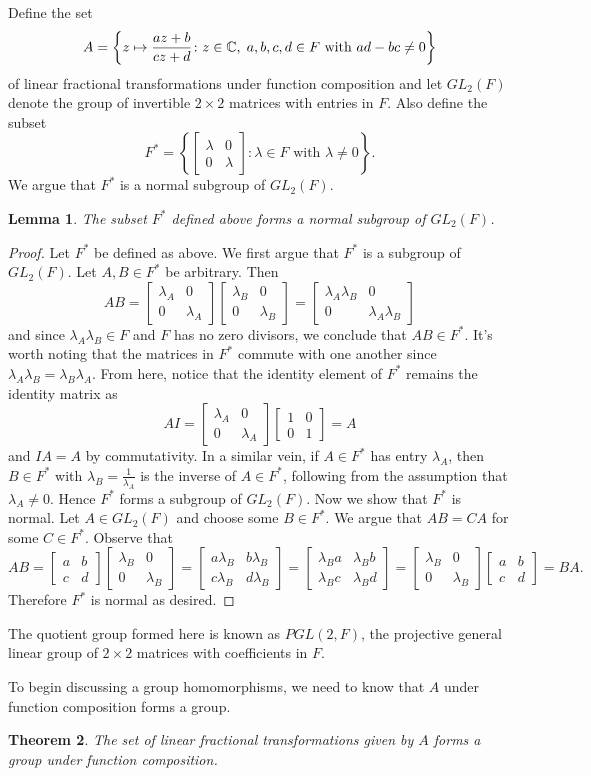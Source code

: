 \documentclass[12pt]{article}
\newcommand{\C}{\mathbb{C}}
\newcommand{\lftmat}[4]{\begin{bmatrix} {#1} & {#2} \\ {#3} & {#4} \end{bmatrix}}
\newcommand{\stanlftmat}{\lftmat{a}{b}{c}{d}}
\newcommand{\ttc}{, \hspace{1mm}}
\theoremstyle{plain}
\newtheorem{theorem}{Theorem}[section]
\newtheorem{lemma}[theorem]{Lemma}
\theoremstyle{definition}
\begin{document}
\begin{appendices}
\noindent Define the set
	\[
		A = \left\lbrace z\mapsto \frac{az + b}{cz + d}\colon z\in\C\ttc a,b,c,d\in F\text{ with } ad - bc \neq 0\right\rbrace
	\]
of linear fractional transformations under function composition and let $GL_2(F)$ denote the group of invertible $2\times 2$ matrices with entries in $F$. Also define the subset
	\[
		F^* = \left\lbrace\lftmat{\lambda}{0}{0}{\lambda}\colon \lambda\in F\text{ with } \lambda\neq 0 \right\rbrace.
	\]
	We argue that $F^*$ is a normal subgroup of $GL_2(F)$.
\begin{lemma}
	The subset $F^*$ defined above forms a normal subgroup of $GL_2(F)$.
\end{lemma}
\begin{proof}
	Let $F^*$ be defined as above. We first argue that $F^*$ is a subgroup of $GL_2(F)$. Let $A,B\in F^*$ be arbitrary. Then
	\[
		AB = \lftmat{\lambda_A}{0}{0}{\lambda_A}\lftmat{\lambda_B}{0}{0}{\lambda_B} = \lftmat{\lambda_A\lambda_B}{0}{0}{\lambda_A\lambda_B}
	\]
	and since $\lambda_A\lambda_B\in F$ and $F$ has no zero divisors, we conclude that $AB\in F^*$. It's worth noting that the matrices in $F^*$ commute with one another since $\lambda_A\lambda_B = \lambda_B\lambda_A$. From here, notice that the identity element of $F^*$ remains the identity matrix as
	\[
		AI = \lftmat{\lambda_A}{0}{0}{\lambda_A}\lftmat{1}{0}{0}{1} = A
	\]
	and $IA = A$ by commutativity. In a similar vein, if $A\in F^*$ has entry $\lambda_A$, then $B\in F^*$ with $\lambda_B = \frac{1}{\lambda_A}$ is the inverse of $A\in F^*$, following from the assumption that $\lambda_A \neq 0$. Hence $F^*$ forms a subgroup of $GL_2(F)$. Now we show that $F^*$ is normal. Let $A\in GL_2(F)$ and choose some $B\in F^*$. We argue that $AB = CA$ for some $C\in F^*$. Observe that
	\[
		AB = \stanlftmat\lftmat{\lambda_B}{0}{0}{\lambda_B} = \lftmat{a\lambda_B}{b\lambda_B}{c\lambda_B}{d\lambda_B} = \lftmat{\lambda_B a}{\lambda_B b}{\lambda_B c}{\lambda_B d} = \lftmat{\lambda_B}{0}{0}{\lambda_B}\stanlftmat = BA.
	\]
	Therefore $F^*$ is normal as desired.
\end{proof}

The quotient group formed here is known as $PGL(2,F)$, the projective general linear group of $2\times 2$ matrices with coefficients in $F$.

	To begin discussing a group homomorphisms, we need to know that $A$ under function composition forms a group. 
	
\begin{theorem}
	The set of linear fractional transformations given by $A$ forms a group under function composition.
\end{theorem}
	

\end{appendices}
\end{document}

